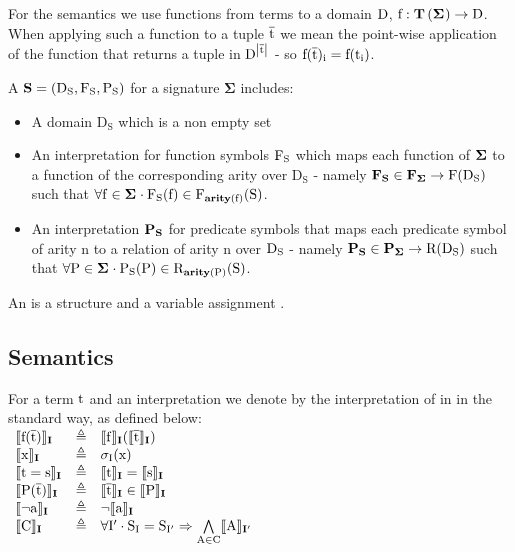 \noindent
For the semantics we use functions from terms to a domain $\mathrm{D}$, $\function{f} : \Ts{\sig} \rightarrow \term{D}$.
When applying such a function to a tuple $\mathrm{\overline{t}}$ we mean the point-wise application of the function that returns a tuple in
$\mathrm{D}^{\left|\mathrm{\overline{t}}\right|}$ - so $\mathrm{f}(\mathrm{\overline{t}})_{\mathrm{i}} = \mathrm{f}(\mathrm{t}_{\mathrm{i}})$.


\bigskip

\noindent
A  $\mathrm{\mathbf{S}=(D_S,F_S,P_S)}$ for a signature $\mathbf{\Sigma}$ includes:
\begin{itemize}
	\item A domain $\mathrm{D_S}$ which is a non empty set
	\item An interpretation for function symbols $\mathrm{F_S}$ which maps each function of $\sig{}$ to a function of the corresponding arity over $\mathrm{D_S}$ -
namely $\mathbf{F_S} \in \mathbf{F_{\sig{}}} \rightarrow \mathrm{F(D_S)}$ such that
$\forall \m{f} \in \mathbf{\sig} \cdot \m{F_S}(\m{f}) \in \m{F_{\arity{f}}(S)}$. 
	\item An interpretation $\mathrm{\mathbf{P_S}}$ for predicate symbols that maps each predicate symbol of arity n to a relation of arity n over $\mathrm{D_S}$ - namely $\mathbf{P_S} \in \mathbf{P_{\sig{}}} \rightarrow \mathrm{R(D_S)}$ such that
$\forall \m{P} \in \mathbf{\sig} \cdot \m{P_S}(\m{P}) \in \m{R_{\arity{P}}(S)}$. 
\end{itemize}

\noindent
An   is a structure  and a variable assignment 
.

\subsection*{Semantics}\label{section:preliminaries:semantics}
For a term $\mathrm{t}$ and an interpretation  we denote by  the interpretation of  in  in the standard way, as defined below:\\
$
\begin{array}{lll}
	\llbracket \mathrm{\mathrm{f}(\mathrm{\overline{t}})} \rrbracket_{\mathbf{I}} & \triangleq & \llbracket \mathrm{\mathrm{f}} \rrbracket_{\mathbf{I}}(\llbracket \mathrm{\mathrm{\overline{t}}} \rrbracket_{\mathbf{I}}) \\
	\llbracket \mathrm{x} \rrbracket_{\mathbf{I}} & \triangleq & \mathrm{\sigma_I(x)} \\
	\llbracket \mathrm{t=s} \rrbracket_{\mathbf{I}} & \triangleq & \llbracket \mathrm{t} \rrbracket_{\mathbf{I}}=\llbracket \mathrm{s} \rrbracket_{\mathbf{I}}  \\
	\llbracket \mathrm{\mathrm{P}(\mathrm{\overline{t}})} \rrbracket_{\mathbf{I}} & \triangleq & \mathrm{\llbracket \mathrm{\mathrm{\overline{t}}} \rrbracket_{\mathbf{I}} \in \llbracket \mathrm{P} \rrbracket_{\mathbf{I}}} \\
	\llbracket \mathrm{\lnot a} \rrbracket_{\mathbf{I}} & \triangleq & \lnot \llbracket \mathrm{a} \rrbracket_{\mathbf{I}} \\
	\llbracket \mathrm{C} \rrbracket_{\mathbf{I}} & \triangleq & \mathrm{\forall I' \cdot S_I = S_{I'} \Rightarrow \bigwedge\limits_{A \in C} \llbracket \mathrm{A} \rrbracket_{\mathbf{I'}}} \\
\end{array}
$

